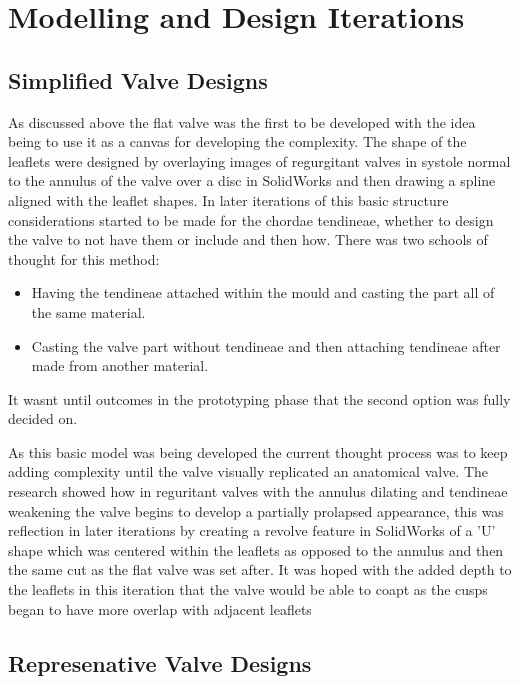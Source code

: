 \section{Modelling and Design Iterations}

\subsection{Simplified Valve Designs}

As discussed above  the flat valve was the first to be developed with the idea being to use it as a canvas for developing the complexity. The shape of the leaflets were designed by overlaying images of regurgitant valves in systole normal to the annulus of the valve over a disc in SolidWorks and then drawing a spline aligned with the leaflet shapes.
In later iterations of this basic structure considerations started to be made for the chordae tendineae, whether to design the valve to not have them or include and then how. There was two schools of thought for this method:
\begin{itemize}
    \item Having the tendineae attached within the mould and casting the part all of the same material.
    \item Casting the valve part without tendineae and then attaching tendineae after made from another material.
\end{itemize}
It wasnt until outcomes in the prototyping phase  that the second option was fully decided on.

\mynewline
{}
As this basic model was being developed the current thought process was to keep adding complexity until the valve visually replicated an anatomical valve.
The research  showed how in reguritant valves with the annulus dilating and tendineae weakening the valve begins to develop a partially prolapsed appearance, this was reflection in later iterations by creating a revolve feature in SolidWorks of a 'U' shape which was centered within the leaflets as opposed to the annulus and then the same cut as the flat valve was set after.
It was hoped with the added depth to the leaflets in this iteration that the valve would be able to coapt as the cusps began to have more overlap with adjacent leaflets

\subsection{Represenative Valve Designs}

